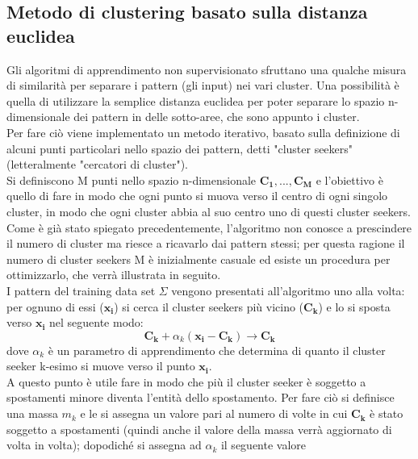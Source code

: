 \newpage

\subsection{Metodo di clustering basato sulla distanza euclidea}
\label{metodo distanza euclidea}
Gli algoritmi di apprendimento non supervisionato sfruttano una qualche misura di similarità per separare i pattern (gli input) nei vari cluster. Una possibilità è quella di utilizzare la semplice distanza euclidea per poter separare lo spazio n-dimensionale dei pattern in delle sotto-aree, che sono appunto i cluster. \\
Per fare ciò viene implementato un metodo iterativo, basato sulla definizione di alcuni punti particolari nello spazio dei pattern, detti "cluster seekers" (letteralmente "cercatori di cluster"). \\
Si definiscono M punti nello spazio n-dimensionale $\textbf{C}_\textbf{1},...,\textbf{C}_\textbf{M}$ e l'obiettivo è quello di fare in modo che ogni punto si muova verso il centro di ogni singolo cluster, in modo che ogni cluster abbia al suo centro uno di questi cluster seekers. \\
Come è già stato spiegato precedentemente, l'algoritmo non conosce a prescindere il numero di cluster ma riesce a ricavarlo dai pattern stessi; per questa ragione il numero di cluster seekers M è inizialmente casuale ed esiste un procedura per ottimizzarlo, che verrà illustrata in seguito. \\
I pattern del training data set $\Sigma$ vengono presentati all'algoritmo uno alla volta: per ognuno di essi ($\textbf{x}_\textbf{i}$) si cerca il cluster seekers più vicino ($\textbf{C}_\textbf{k}$) e lo si sposta verso $\textbf{x}_\textbf{i}$ nel seguente modo:
\begin{equation}
\textbf{C}_\textbf{k} + \alpha_k(\textbf{x}_\textbf{i} - \textbf{C}_\textbf{k}) \rightarrow \textbf{C}_\textbf{k}
\end{equation}
dove $\alpha_k$ è un parametro di apprendimento che determina di quanto il cluster seeker k-esimo si muove verso il punto $\textbf{x}_\textbf{i}$. \\
A questo punto è utile fare in modo che più il cluster seeker è soggetto a spostamenti minore diventa l'entità dello spostamento. Per fare ciò si definisce una massa $m_k$ e le si assegna un valore pari al numero di volte in cui $\textbf{C}_\textbf{k}$ è stato soggetto a spostamenti (quindi anche il valore della massa verrà aggiornato di volta in volta); dopodiché si assegna ad $\alpha_k$ il seguente valore
